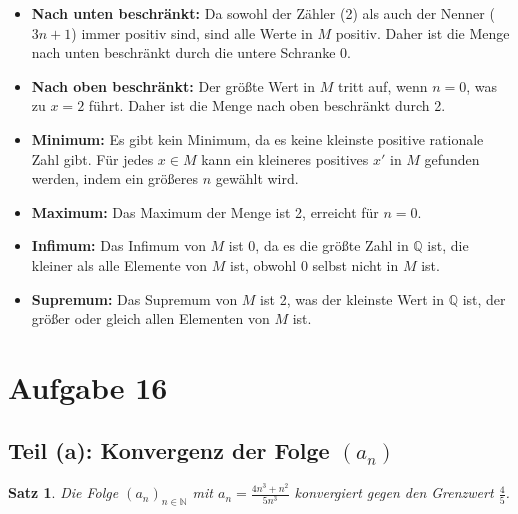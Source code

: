 \documentclass{article}
\newtheorem*{theorem}{Satz}
\theoremstyle{definition}
\theoremstyle{remark}
\begin{document}
\begin{itemize}
	\item \textbf{Nach unten beschränkt:} Da sowohl der Zähler (2) als auch der Nenner ($3n+1$) immer positiv sind, sind alle Werte in $M$ positiv. Daher ist die Menge nach unten beschränkt durch die untere Schranke 0.
	\item \textbf{Nach oben beschränkt:} Der größte Wert in $M$ tritt auf, wenn $n=0$, was zu $x=2$ führt. Daher ist die Menge nach oben beschränkt durch 2.
	\item \textbf{Minimum:} Es gibt kein Minimum, da es keine kleinste positive rationale Zahl gibt. Für jedes $x \in M$ kann ein kleineres positives $x'$ in $M$ gefunden werden, indem ein größeres $n$ gewählt wird.
	\item \textbf{Maximum:} Das Maximum der Menge ist 2, erreicht für $n=0$.
	\item \textbf{Infimum:} Das Infimum von $M$ ist 0, da es die größte Zahl in $\mathbb{Q}$ ist, die kleiner als alle Elemente von $M$ ist, obwohl 0 selbst nicht in $M$ ist.
	\item \textbf{Supremum:} Das Supremum von $M$ ist 2, was der kleinste Wert in $\mathbb{Q}$ ist, der größer oder gleich allen Elementen von $M$ ist.
\end{itemize}

\section*{Aufgabe 16}

\subsection*{Teil (a): Konvergenz der Folge \((a_n)\)}
\begin{theorem}
	Die Folge \((a_n)_{n\in\mathbb{N}}\) mit \(a_n = \frac{4n^3 + n^2}{5n^3}\) konvergiert gegen den Grenzwert \(\frac{4}{5}\).
\end{theorem}
\end{document}
